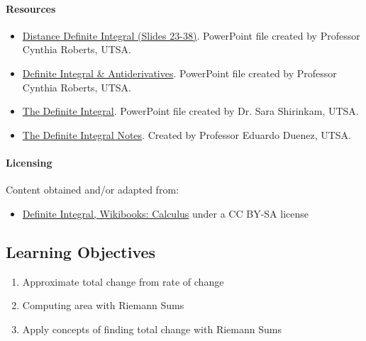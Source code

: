 \paragraph{Resources}



\begin{itemize}
    \item \href{https://mathresearch.utsa.edu/wikiFiles/MAT1193/The\%20Definite\%20Integral/Presentation11_Distance_Definite_Integral.pptx}{Distance Definite Integral (Slides 23-38)}. PowerPoint file created by Professor Cynthia Roberts, UTSA.
    \item \href{https://mathresearch.utsa.edu/wikiFiles/MAT1193/The\%20Definite\%20Integral/Presentation12_DefiniteIntegral_\%20Antiderivatives.pptx}{Definite Integral \& Antiderivatives}. PowerPoint file created by Professor Cynthia Roberts, UTSA.
    \item \href{https://mathresearch.utsa.edu/wikiFiles/MAT1214/The\%20Definite\%20Integral/MAT1214-5.3TheDefiniteIntegralPwPt.pptx}{The Definite Integral}. PowerPoint file created by Dr. Sara Shirinkam, UTSA.
    \item \href{https://mathresearch.utsa.edu/wikiFiles/MAT1214/The\%20Definite\%20Integral/MAT1214-5.3TheDefiniteIntegralNotes.pdf}{The Definite Integral Notes}. Created by Professor Eduardo Duenez, UTSA.
\end{itemize}

\paragraph{Licensing}



Content obtained and/or adapted from:  

\begin{itemize}
    \item \href{https://en.wikibooks.org/wiki/Calculus/Definite_integral}{Definite Integral, Wikibooks: Calculus} under a CC BY-SA license
\end{itemize}

\subsection{Learning Objectives}

\begin{enumerate}
    \item Approximate total change from rate of change
    \item Computing area with Riemann Sums
    \item Apply concepts of finding total change with Riemann Sums
\end{enumerate}

